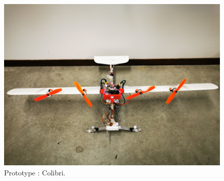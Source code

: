 \begin{figure}[ht!]
    \centering
    \includegraphics[trim={0 15cm 0 25cm},clip, width=0.6\columnwidth]{figures/colibri_real.jpg}
    \caption{Prototype : Colibri.}
    \label{fig:colibri_real}
\end{figure}

